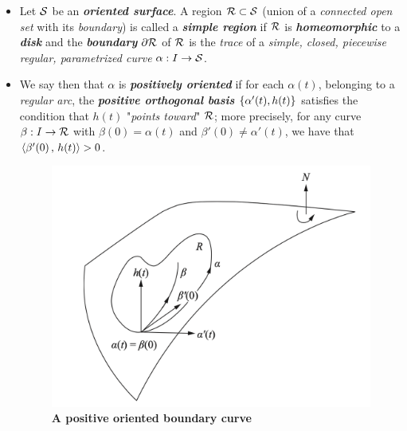\documentclass[11pt]{article}
\begin{document}
\begin{itemize}
\item \begin{definition}
Let ${\mathcal S}$ be an \emph{\textbf{oriented surface}}. A region ${\mathcal R} \subset {\mathcal S}$ (union of a \emph{connected open set} with its \emph{boundary}) is called a \emph{\textbf{simple region}} if ${\mathcal R}$ is \emph{\textbf{homeomorphic}} to a \emph{\textbf{disk}} and the \emph{\textbf{boundary}} $\partial {\mathcal R}$ of ${\mathcal R}$ is the \emph{trace} of a \emph{simple, closed, piecewise regular, parametrized curve} $\alpha: I \rightarrow {\mathcal S}$. 
\end{definition}

\item \begin{definition}
We say then that $\alpha$ is \emph{\textbf{positively oriented}} if for each $\alpha(t)$, belonging to a \emph{regular arc}, the \emph{\textbf{positive orthogonal basis}} $\left\{\alpha'(t), h(t)\right\}$ satisfies the condition that $h(t)$ "\emph{points toward}" ${\mathcal R}$; more precisely, for any curve $\beta: I \rightarrow {\mathcal R}$ with $\beta(0) = \alpha(t)$ and $\beta'(0)  \neq  \alpha'(t)$, we have that 
$\left\langle \beta'(0)\,,\, h(t) \right\rangle > 0$.
\end{definition}

\begin{figure}[htb]
\centering
\begin{minipage}{1\linewidth}
 \centerline{\includegraphics[scale = 0.5]{positive_oriented_boundary_curve.png}}
\end{minipage}
\caption{\scriptsize
\textbf{A positive oriented boundary curve \citep{do1976differential}}}
\label{fig: positive_oriented_boundary_curve}
\end{figure}



\end{itemize}
\end{document}
